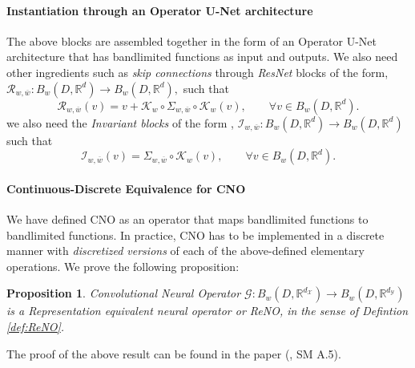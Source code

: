 \documentclass[reqno,10pt]{amsart}
\theoremstyle{plain}
\newtheorem{prop}{Proposition}
\theoremstyle{definition}
\newcommand{\bb}[1]{\mathbb{#1}}
\newcommand{\cal}[1]{\mathcal{#1}}
\begin{document}
    \paragraph{\bf Instantiation through an Operator U-Net architecture} The above blocks are assembled together in the form of an Operator U-Net architecture that has bandlimited functions as input and outputs. We also need other ingredients such as {\it skip connections} through {\it ResNet} blocks of the form, $\cal R_{w,\overline{w}} : B_w(D,\bb R^d) \to B_w(D,\bb R^d),$ such that
    \begin{equation}
        \cal R_{w,\overline{w}}(v) = v + \cal K_w \circ \Sigma_{w,\overline{w}} \circ \cal K_w(v), \qquad \forall v \in B_w(D,\bb R^d).        
    \end{equation}
    we also need the {\it Invariant blocks} of the form , $\cal I_{w,\overline{w}}:B_w(D,\bb R^d) \to B_w(D,\bb R^d)$ such that 
    \begin{equation}
        \cal I_{w,\overline{w}}(v) = \Sigma_{w,\overline{w}} \circ \cal K_w(v), \qquad \forall v \in B_w(D,\bb R^d).
    \end{equation}

    \paragraph{\bf Continuous-Discrete Equivalence for CNO} We have defined CNO as an operator that maps bandlimited functions to bandlimited functions. In practice, CNO has to be implemented in a discrete manner with {\it discretized versions} of each of the above-defined elementary operations. We prove the following proposition:
    \begin{prop}
        Convolutional Neural Operator $\cal G: B_w(D,\bb R^{d_{\cal X}}) \to B_w(D,\bb R^{d_{\cal Y}})$ is a Representation equivalent neural operator or ReNO, in the sense of Defintion \ref{def:ReNO}.      
    \end{prop}
    \noindent The proof of the above result can be found in the paper (\cite{BR2023}, SM A.5).
\end{document}
